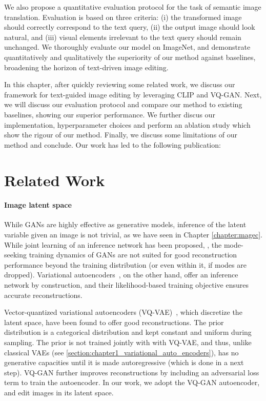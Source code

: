 We also propose a quantitative evaluation protocol for the task of semantic image 
translation. 
Evaluation is based on three criteria: (i) the transformed image should correctly 
correspond to the text query, (ii) the output image should look natural,  and (iii) 
visual elements irrelevant to the text query should remain unchanged. 
We thoroughly evaluate our model on ImageNet, and  demonstrate quantitatively and 
qualitatively the superiority of our method against baselines, broadening the horizon 
of text-driven image editing.


In this chapter, after quickly reviewing some related work, we discuss our framework for 
text-guided image editing by leveraging \ac{CLIP} 
and VQ-GAN. Next, we will discuss our evaluation protocol and compare our method to existing baselines, 
showing our superior performance. We further discus our implementation, hyperparameter choices and perform an 
ablation study which show the rigour of our method. Finally, we discuss some limitations of our method and 
conclude. Our work has led to the following publication:


\section{Related Work}


\paragraph{Image latent space}
While GANs are highly effective as generative models, inference of the latent variable 
given an image is not trivial, as we have seen in Chapter \ref{chapter:magec}. 
While joint learning of an inference network has been proposed, \citep{donahue17iclr,dumoulin17iclr}, 
the mode-seeking training dynamics of GANs are 
 not suited for good reconstruction performance beyond the training distribution 
 (or even within it, if modes are dropped).
Variational autoencoders~\cite{Kingma2014}, on the other hand, offer an inference 
network by construction, and their likelihood-based training objective ensures accurate 
reconstructions.

Vector-quantized  variational autoencoders (VQ-VAE)~\cite{oord17nips,razavi2019generating},
 which discretize the latent space, have been found to offer good reconstructions. The prior distribution
 is a categorical distribution and kept constant and uniform during sampling.
 The prior is not trained jointly with with VQ-VAE, and thus, unlike classical \ac{VAE}s (see \ref{section:chapter1_variational_auto_encoders}),
 has no generative capacities until it is made autoregressive (which is done in a next step). 
VQ-GAN \citep{esser2021taming,yu2021vector} further improves reconstructions 
by  including an adversarial loss term to train the autoencoder.
In our work,  we adopt the VQ-GAN autoencoder,  and edit  images in its latent space.



